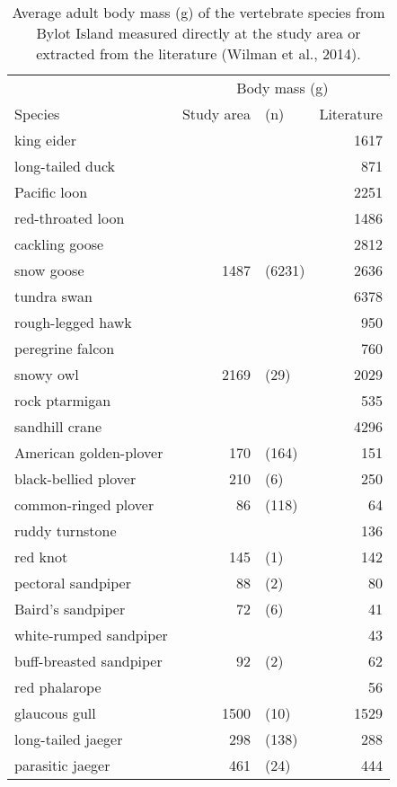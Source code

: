 \begin{table}[ht]
\centering
\caption{Average adult body mass (g) of the vertebrate species from Bylot Island measured directly at the study area or extracted from the literature (Wilman et al., 2014).} 
\label{table:body_mass}
\begingroup\fontsize{10pt}{10pt}\selectfont
\begin{tabularx}{0.6\textwidth}{lrlr}
  \hline
  & \multicolumn{3}{c}{Body mass (g)} \\
 Species & Study area & (n) & Literature \\
 \hline
king eider &  &  & 1617 \\ 
  long-tailed duck &  &  & 871 \\ 
  Pacific loon &  &  & 2251 \\ 
  red-throated loon &  &  & 1486 \\ 
  cackling goose &  &  & 2812 \\ 
  snow goose & 1487 & (6231) & 2636 \\ 
  tundra swan &  &  & 6378 \\ 
  rough-legged hawk &  &  & 950 \\ 
  peregrine falcon &  &  & 760 \\ 
  snowy owl & 2169 & (29) & 2029 \\ 
  rock ptarmigan &  &  & 535 \\ 
  sandhill crane &  &  & 4296 \\ 
  American golden-plover & 170 & (164) & 151 \\ 
  black-bellied plover & 210 & (6) & 250 \\ 
  common-ringed plover & 86 & (118) & 64 \\ 
  ruddy turnstone &  &  & 136 \\ 
  red knot & 145 & (1) & 142 \\ 
  pectoral sandpiper & 88 & (2) & 80 \\ 
  Baird's sandpiper & 72 & (6) & 41 \\ 
  white-rumped sandpiper &  &  & 43 \\ 
  buff-breasted sandpiper & 92 & (2) & 62 \\ 
  red phalarope &  &  & 56 \\ 
  glaucous gull & 1500 & (10) & 1529 \\ 
  long-tailed jaeger & 298 & (138) & 288 \\ 
  parasitic jaeger & 461 & (24) & 444 \\ 

\end{tabularx}
\end{table}
